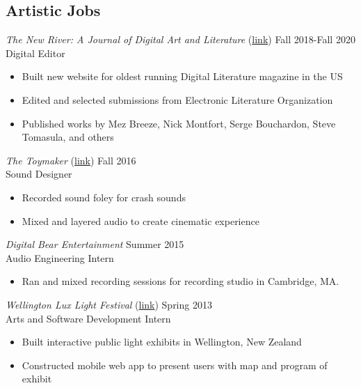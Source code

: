 \subsection{Artistic Jobs}

\emph{The New River: A Journal of Digital Art and Literature} (\href{http://thenewriver.us/}{link}) \hfill
 Fall 2018-Fall 2020 \\
 Digital Editor  \\
 \begin{itemize}
 \item Built new website for oldest running Digital Literature magazine in the US
 \item Edited and selected submissions from Electronic Literature Organization
 \item Published works by Mez Breeze, Nick Montfort, Serge Bouchardon, Steve Tomasula, and others
 \end{itemize}
 
 \emph{The Toymaker} (\href{https://vimeo.com/242488116}{link}) \hfill
Fall 2016 \\
Sound Designer  \\
 \begin{itemize}
 \item Recorded sound foley for crash sounds
 \item Mixed and layered audio to create cinematic experience
 \end{itemize}

{\sl Digital Bear Entertainment} \hfill
Summer 2015 \\
Audio Engineering Intern \\
\begin{itemize}
\item Ran and mixed recording sessions for recording studio in Cambridge, MA.
\end{itemize}

{\sl Wellington Lux Light Festival}  (\href{https://www.facebook.com/LUXLightfestival/}{link}) \hfill Spring 2013 \\
Arts and Software Development Intern \\
\begin{itemize}
\item Built interactive public light exhibits in Wellington, New Zealand
\item Constructed mobile web app to present users with map and program of exhibit 
\end{itemize}